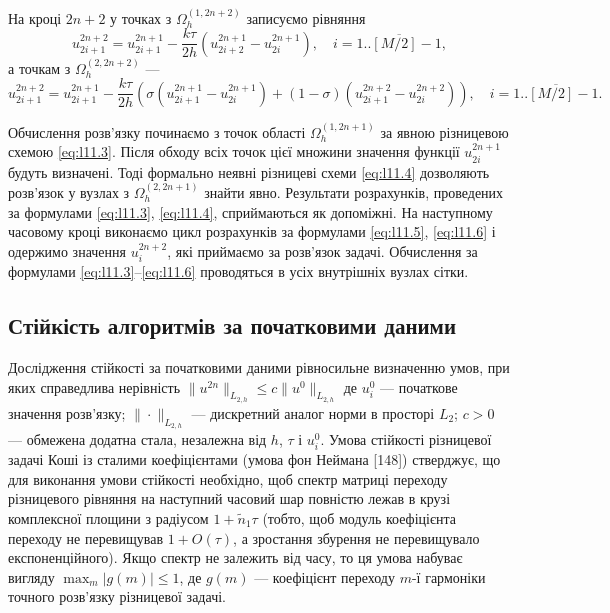 На кроці $2 n + 2$ у точках з $\Omega_h^{(1,2n+2)}$ записуємо рівняння
\begin{equation}
    \label{eq:l11.5}
    u_{2i+1}^{2n+2} = u_{2i+1}^{2n+1} - \frac{k \tau}{2 h} \left( u_{2i+2}^{2n+1} - u_{2i}^{2n+1} \right), \quad i = \overline{1..[M/2]-1},
\end{equation}
а точкам з $\Omega_h^{(2,2n+2)}$ ---
\begin{equation}
    \label{eq:l11.6}
 	u_{2i+1}^{2n+2} = u_{2i+1}^{2n+1} - \frac{k \tau}{2 h} \left( \sigma \left( u_{2i+1}^{2n+1} - u_{2i}^{2n+1} \right) + (1 - \sigma) \left( u_{2i+1}^{2n+2} - u_{2i}^{2n+2} \right) \right), \quad i = \overline{1..[M/2]-1}.
\end{equation}

Обчислення розв'язку починаємо з точок області $\Omega_h^{(1,2n+1)}$ за явною різницевою схемою \eqref{eq:l11.3}. Після обходу всіх точок цієї множини значення функції $u_{2i}^{2n+1}$ будуть визначені. Тоді формально неявні різницеві схеми \eqref{eq:l11.4} дозволяють розв'язок у вузлах з $\Omega_h^{(2,2n+1)}$ знайти явно. Результати розрахунків, проведених за формулами \eqref{eq:l11.3}, \eqref{eq:l11.4}, сприймаються як допоміжні. На наступному часовому кроці виконаємо цикл розрахунків за формулами \eqref{eq:l11.5}, \eqref{eq:l11.6} і одержимо значення $u_i^{2n+2}$, які приймаємо за розв'язок задачі. Обчислення за формулами \eqref{eq:l11.3}--\eqref{eq:l11.6} проводяться в усіх внутрішніх вузлах сітки. 

\subsection{Стійкість алгоритмів за початковими даними}

Дослідження стійкості за початковими даними рівносильне визначенню умов, при яких справедлива нерівність $\|u^{2n}\|_{L_{2,h}} \le c \|u^0\|_{L_{2,h}}$ де $u_i^0$ --- початкове значення розв'язку; $\|\cdot\|_{L_{2,h}}$ --- дискретний аналог норми в просторі $L_2$; $c > 0$ --- обмежена додатна стала, незалежна від $h$, $\tau$ і $u_i^0$. Умова стійкості різницевої задачі Коші із сталими коефіцієнтами (умова фон Неймана [148]) стверджує, що для виконання умови стійкості необхідно, щоб спектр матриці переходу різницевого рівняння на наступний часовий шар повністю лежав в крузі комплексної площини з радіусом $1 + \tilde n_1 \tau$ (тобто, щоб модуль коефіцієнта переходу не перевищував $1 + O(\tau)$, а зростання збурення не перевищувало експоненційного). Якщо спектр не залежить від часу, то ця умова набуває вигляду $\max_m |g(m)| \le 1$, де $g(m)$ --- коефіцієнт переходу $m$-ї гармоніки точного розв'язку різницевої задачі.

